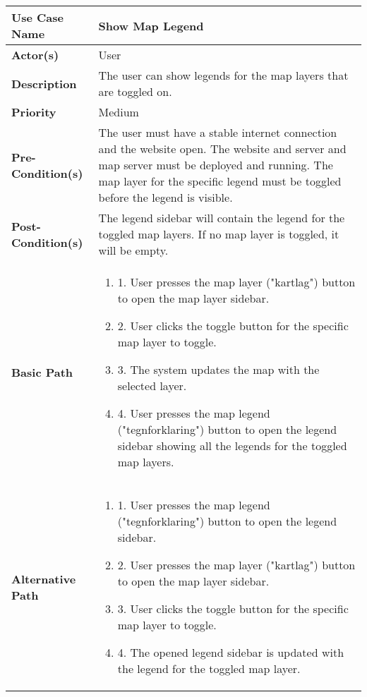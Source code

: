 \begin{table}[h]
    \centering
    \renewcommand{\arraystretch}{1.5}
    \begin{tabularx}{\textwidth}{|l|X|}
        \hline
        \rowcolor{gray!20}
        \textbf{Use Case Name} & Show Map Legend \\
        \hline
        \textbf{Actor(s)} & User \\
        \hline
        \textbf{Description} & The user can show legends for the map layers that are toggled on. \\
        \hline
        \textbf{Priority} & Medium \\
        \hline
        \textbf{Pre-Condition(s)} & The user must have a stable internet connection and the website open. The website and server and map server must be deployed and running. The map layer for the specific legend must be toggled before the legend is visible. \\
        \hline
        \textbf{Post-Condition(s)} & The legend sidebar will contain the legend for the toggled map layers. If no map layer is toggled, it will be empty. \\
        \hline
        \textbf{Basic Path} &  
        \begin{enumerate}[label=,left=0pt]
            \item 1. User presses the map layer ("kartlag") button to open the map layer sidebar.
            \item 2. User clicks the toggle button for the specific map layer to toggle.
            \item 3. The system updates the map with the selected layer.
            \item 4. User presses the map legend ("tegnforklaring") button to open the legend sidebar showing all the legends for the toggled map layers.
        \end{enumerate} \\
        \hline
        \textbf{Alternative Path} & 
        \begin{enumerate}[label=,left=0pt]
            \item 1. User presses the map legend ("tegnforklaring") button to open the legend sidebar.
            \item 2. User presses the map layer ("kartlag") button to open the map layer sidebar.
            \item 3. User clicks the toggle button for the specific map layer to toggle.
            \item 4. The opened legend sidebar is updated with the legend for the toggled map layer.

\end{enumerate}
\end{tabularx}
\end{table}
